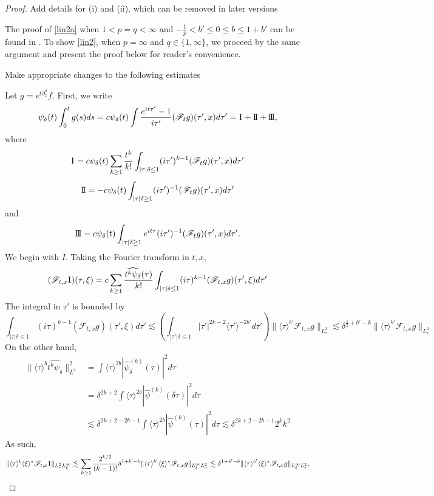 \documentclass[a4paper, 11pt]{amsart}
\newcommand{\jap}[1]{\langle #1 \rangle}
\theoremstyle{plain}
\theoremstyle{definition}
\theoremstyle{remark}
\newcommand{\I}{\hspace{0.2mm}\textup{I}\hspace{0.2mm}}
\newcommand{\II}{\text{I \hspace{-2.9mm} I} }
\newcommand{\III}{\text{I \hspace{-2.9mm} I \hspace{-2.9mm} I}}
\newcommand{\5}{\text{V}}
\numberwithin{equation}{section}
\theoremstyle{mytheoremstyle} \newtheorem{nota}[thm]{Remark}
\theoremstyle{mytheoremstyle} \newtheorem{exemplo}[thm]{Example}
\newcommand{\red}{\color{red}}
\newcommand{\blue}{\color{blue}}
\begin{document}
\begin{proof}

{\red Add details for (i) and (ii), which can be removed in later versions}


The proof of \eqref{lin2a} when $1<p=q<\infty$ and $-\frac1p<b'\le 0 \le b \le 1 + b'$ can be found in \cite[Lemma 2]{G03}.
%
To show \eqref{lin2}, when $p=\infty$ and $ q\in\{1, \infty\}$, we proceed by the same argument and present the proof below for reader's convenience.



{\red Make appropriate changes to the following estimates}


\blue

 Let $g=e^{t\partial_x^3}f$. First, we write
$$
\psi_\delta(t)\int_0^t g(s) ds = c\psi_\delta(t)\int \frac{e^{it\tau'}-1}{i\tau'} (\mathcal{F}_tg)(\tau',x) d\tau' = \I + \II + \III,
$$
where
$$
\I=c\psi_\delta(t)\sum_{k\ge 1} \frac{t^k}{k!}\int_{|\tau|\delta \le 1} (i\tau')^{k-1} (\mathcal{F}_tg)(\tau',x) d\tau'
$$
$$
\II=-c\psi_\delta(t)\int_{|\tau|\delta \ge 1} (i\tau')^{-1} (\mathcal{F}_tg)(\tau',x) d\tau'
$$
and
$$
\III=c\psi_\delta(t)\int_{|\tau|\delta \ge 1} e^{it\tau}(i\tau')^{-1} (\mathcal{F}_tg)(\tau',x) d\tau'.
$$
We begin with $I$. Taking the Fourier transform in $t,x$,
\begin{align*}
	(\mathcal{F}_{t,x}\I)(\tau, \xi) = c\sum_{k\ge 1} \frac{\widehat{t^k\psi_\delta}(\tau)}{k!} \int_{|\tau|\delta \le 1} (i\tau)^{k-1} (\mathcal{F}_{t,x}g)(\tau',\xi) d\tau'
\end{align*}
The integral in $\tau'$ is bounded by
$$
\int_{|\tau|\delta \le 1} (i\tau)^{k-1} (\mathcal{F}_{t,x}g)(\tau',\xi) d\tau' \lesssim \left(\int_{|\tau'|\delta\le 1}|\tau'|^{2k-2}\jap{\tau'}^{-2b'} d\tau'\right)\|\jap{\tau}^{b'}\mathcal{F}_{t,x}g\|_{L^2_\tau}\lesssim \delta^{\frac{1}{2}+b'-k}\|\jap{\tau}^{b'}\mathcal{F}_{t,x}g\|_{L^2_\tau}
$$
On the other hand,
\begin{align*}
	\|\jap{\tau}^b \widehat{t^k\psi_\delta}\|_{L^2}^2 &= \int \jap{\tau}^{2b}|\hat{\psi}_\delta^{(k)}(\tau)|^2 d\tau \\
 &= \delta^{2k+2} \int \jap{\tau}^{2b}|\hat{\psi}^{(k)}(\delta \tau)|^2d\tau \\
 &\lesssim \delta^{2k+2-2b-1} \int \jap{\tau}^{2b}|\hat{\psi}^{(k)}(\tau)|^2 d\tau \lesssim \delta^{2k+2-2b-1}2^kk^2
\end{align*}
As such,
$$
\|\jap{\tau}^b\jap{\xi}^s \mathcal{F}_{t,x}\I\|_{L^2_\tau L^\infty_\xi} \lesssim \sum_{k\ge 1}\frac{2^{k/2}}{{(k-1)!}} \delta^{1+b'-b}\|\jap{\tau}^{b'}\jap{\xi}^s \mathcal{F}_{t,x}g\|_{ L^\infty_\xi L^2_\tau}\lesssim \delta^{1+b'-b}\|\jap{\tau}^{b'}\jap{\xi}^s \mathcal{F}_{t,x}g\|_{ L^\infty_\xi L^2_\tau}.
$$
\end{proof}
\end{document}
